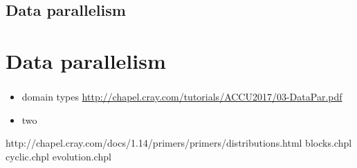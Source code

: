 
\section{Data parallelism}
\chapter{Data parallelism}
\subsection{} %

\begin{frame}{}
  \begin{itemize}\setlength{\itemsep}{3mm}
    \item domain types \url{http://chapel.cray.com/tutorials/ACCU2017/03-DataPar.pdf}
    \item two
  \end{itemize}
\end{frame}

http://chapel.cray.com/docs/1.14/primers/primers/distributions.html
blocks.chpl
cyclic.chpl
evolution.chpl